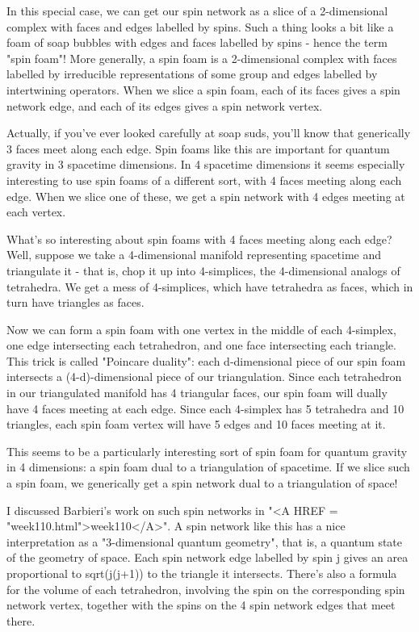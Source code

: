 In this special case, we can get our spin network as a slice of a
2-dimensional complex with faces and edges labelled by spins.  Such a
thing looks a bit like a foam of soap bubbles with edges and faces labelled 
by spins - hence the term "spin foam"!  More generally, a spin foam is a
2-dimensional complex with faces labelled by irreducible representations
of some group and edges labelled by intertwining operators.  When we
slice a spin foam, each of its faces gives a spin network edge, and each
of its edges gives a spin network vertex.

Actually, if you've ever looked carefully at soap suds, you'll know that
generically 3 faces meet along each edge.  Spin foams like this are
important for quantum gravity in 3 spacetime dimensions.  In 4 spacetime
dimensions it seems especially interesting to use spin foams of a
different sort, with 4 faces meeting along each edge.  When we slice one
of these, we get a spin network with 4 edges meeting at each vertex.

What's so interesting about spin foams with 4 faces meeting along each
edge?  Well, suppose we take a 4-dimensional manifold representing
spacetime and triangulate it - that is, chop it up into 4-simplices,
the 4-dimensional analogs of tetrahedra.  We get a mess of 4-simplices,
which have tetrahedra as faces, which in turn have triangles as faces.

Now we can form a spin foam with one vertex in the middle of each
4-simplex, one edge intersecting each tetrahedron, and one face
intersecting each triangle.  This trick is called "Poincare duality":
each d-dimensional piece of our spin foam intersects a (4-d)-dimensional
piece of our triangulation.  Since each tetrahedron in our triangulated
manifold has 4 triangular faces, our spin foam will dually have 4 faces
meeting at each edge.  Since each 4-simplex has 5 tetrahedra and 10
triangles, each spin foam vertex will have 5 edges and 10 faces meeting
at it.  

This seems to be a particularly interesting sort of spin foam for
quantum gravity in 4 dimensions: a spin foam dual to a triangulation of
spacetime.  If we slice such a spin foam, we generically get a spin
network dual to a triangulation of space!  

I discussed Barbieri's work on such spin networks in "<A HREF = "week110.html">week110</A>".  A spin
network like this has a nice interpretation as a "3-dimensional quantum
geometry", that is, a quantum state of the geometry of space.  Each spin
network edge labelled by spin j gives an area proportional to
sqrt(j(j+1)) to the triangle it intersects.  There's also a formula for
the volume of each tetrahedron, involving the spin on the corresponding
spin network vertex, together with the spins on the 4 spin network edges
that meet there.

